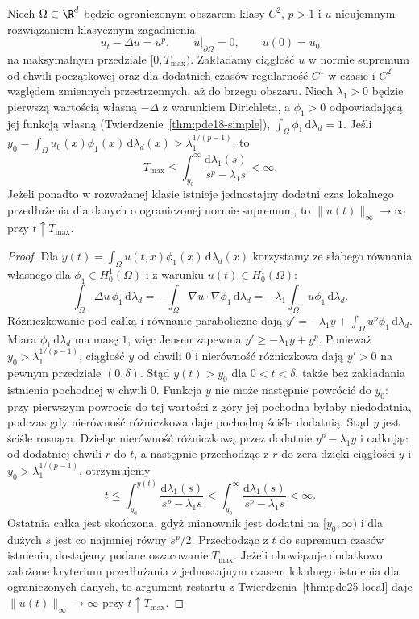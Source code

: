 \begin{twierdzenie}
\label{thm:pde25-kaplan}
Niech $\Omega\subset\R^d$ będzie ograniczonym obszarem
klasy $C^2$, $p>1$ i $u$ nieujemnym rozwiązaniem klasycznym
zagadnienia
\[
 u_t-\Delta u=u^p,\qquad
 u|_{\partial\Omega}=0,\qquad u(0)=u_0
\]
na maksymalnym przedziale $[0,T_{\max})$.
Zakładamy ciągłość $u$ w normie supremum od chwili
początkowej oraz dla dodatnich czasów regularność
$C^1$ w czasie i $C^2$ względem zmiennych przestrzennych,
aż do brzegu obszaru.
Niech $\lambda_1>0$ będzie pierwszą wartością własną
$-\Delta$ z warunkiem Dirichleta, a $\phi_1>0$
odpowiadającą jej funkcją własną
(Twierdzenie~\ref{thm:pde18-simple}),
$\int_\Omega\phi_1\,\mathrm d\lambda_d=1$.
Jeśli
$y_0=\int_\Omega u_0(x)\phi_1(x)\,\mathrm d\lambda_d(x)
>\lambda_1^{1/(p-1)}$,
to
\[
 T_{\max}\le
 \int_{y_0}^{\infty}\frac{\mathrm d\lambda_1(s)}
 {s^p-\lambda_1s}<\infty.
\]
Jeżeli ponadto w rozważanej klasie istnieje
jednostajny dodatni czas lokalnego przedłużenia
dla danych o ograniczonej normie supremum,
to $\|u(t)\|_\infty\to\infty$ przy $t\uparrow T_{\max}$.
\end{twierdzenie}
\begin{proof}
Dla $y(t)=\int_\Omega u(t,x)\phi_1(x)
\,\mathrm d\lambda_d(x)$ korzystamy ze słabego równania
własnego dla $\phi_1\in H_0^1(\Omega)$ i z warunku
$u(t)\in H_0^1(\Omega)$:
\[
 \int_\Omega\Delta u\,\phi_1\,\mathrm d\lambda_d
 =-\int_\Omega\nabla u\cdot\nabla\phi_1\,\mathrm d\lambda_d
 =-\lambda_1\int_\Omega u\phi_1\,\mathrm d\lambda_d .
\]
Różniczkowanie pod całką i równanie paraboliczne dają
$y'=-\lambda_1y+\int_\Omega u^p\phi_1\,
\mathrm d\lambda_d$.
Miara $\phi_1\,\mathrm d\lambda_d$ ma masę $1$,
więc Jensen zapewnia $y'\ge-\lambda_1y+y^p$.
Ponieważ $y_0>\lambda_1^{1/(p-1)}$, ciągłość $y$
od chwili $0$ i nierówność różniczkowa dają $y'>0$
na pewnym przedziale $(0,\delta)$. Stąd $y(t)>y_0$
dla $0<t<\delta$, także bez zakładania istnienia
pochodnej w chwili $0$. Funkcja $y$ nie może
następnie powrócić do $y_0$: przy pierwszym powrocie do
tej wartości z góry jej pochodna byłaby niedodatnia,
podczas gdy nierówność różniczkowa daje pochodną
ściśle dodatnią. Stąd $y$ jest ściśle rosnąca.
Dzieląc nierówność różniczkową przez dodatnie
$y^p-\lambda_1y$ i całkując od dodatniej chwili $r$
do $t$, a następnie przechodząc z $r$ do zera
dzięki ciągłości $y$ i $y_0>\lambda_1^{1/(p-1)}$,
otrzymujemy
\[
 t\le\int_{y_0}^{y(t)}\frac{\mathrm d\lambda_1(s)}
 {s^p-\lambda_1s}
 <\int_{y_0}^{\infty}\frac{\mathrm d\lambda_1(s)}
 {s^p-\lambda_1s}<\infty.
\]
Ostatnia całka jest skończona, gdyż mianownik
jest dodatni na $[y_0,\infty)$ i dla dużych $s$
jest co najmniej równy $s^p/2$.
Przechodząc z $t$ do supremum czasów istnienia,
dostajemy podane oszacowanie $T_{\max}$.
Jeżeli obowiązuje dodatkowo założone kryterium przedłużania
z jednostajnym czasem lokalnego istnienia dla
ograniczonych danych, to argument restartu
z Twierdzenia~\ref{thm:pde25-local} daje
$\|u(t)\|_\infty\to\infty$ przy $t\uparrow T_{\max}$.
\end{proof}

